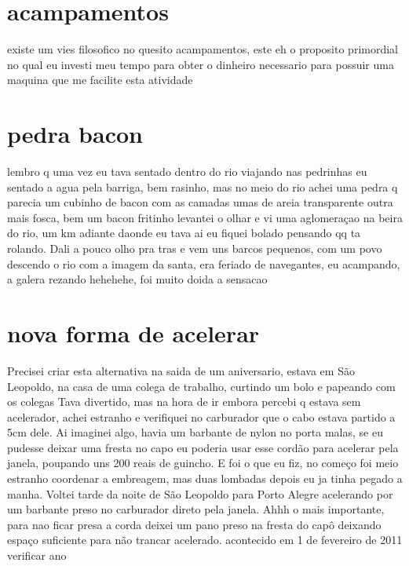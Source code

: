 \documentclass[a4paper]{report}
\begin{document}
\section*{acampamentos}
	existe um vies filosofico no quesito acampamentos, este eh o proposito primordial no qual eu investi meu tempo para obter o dinheiro necessario para possuir uma maquina que me facilite esta atividade


\section*{pedra bacon}

 lembro q uma vez eu tava sentado dentro do rio viajando nas pedrinhas eu sentado a agua pela barriga, bem rasinho, mas no meio do rio
 achei uma pedra q parecia um cubinho de bacon  com as camadas umas de areia transparente outra mais fosca, bem um bacon fritinho
 levantei o olhar e vi uma aglomeraçao na beira do rio, um km adiante daonde eu tava
 ai eu fiquei bolado pensando qq ta rolando.  Dali a pouco olho pra tras e vem uns barcos pequenos, com um povo descendo o rio
 com a imagem da santa, era feriado de navegantes,  eu acampando,  a galera rezando hehehehe,  foi muito doida a sensacao

 

\section*{nova forma de acelerar}

Precisei criar esta alternativa na saida de um aniversario, estava em S\~ao Leopoldo, na casa de uma colega de trabalho, curtindo um bolo e papeando com os colegas
Tava divertido, mas na hora de ir embora percebi q estava sem acelerador, achei estranho e verifiquei no carburador que o cabo estava partido a 5cm dele.
Ai imaginei algo, havia um barbante de nylon no porta malas, se eu pudesse deixar uma fresta no capo eu poderia usar esse cord\~ao para acelerar pela janela, poupando uns 200 reais de guincho.
E foi o que eu fiz, no come\c{c}o foi meio estranho coordenar a embreagem, mas duas lombadas depois eu ja tinha pegado a manha.
Voltei tarde da noite de S\~ao Leopoldo para Porto Alegre acelerando por um barbante preso no carburador direto pela janela.
Ahhh o mais importante, para nao ficar presa a corda deixei um pano preso na fresta do cap\^o deixando espa\c{c}o suficiente para n\~ao trancar acelerado. 
acontecido em 1 de fevereiro de 2011 verificar ano
\end{document}
